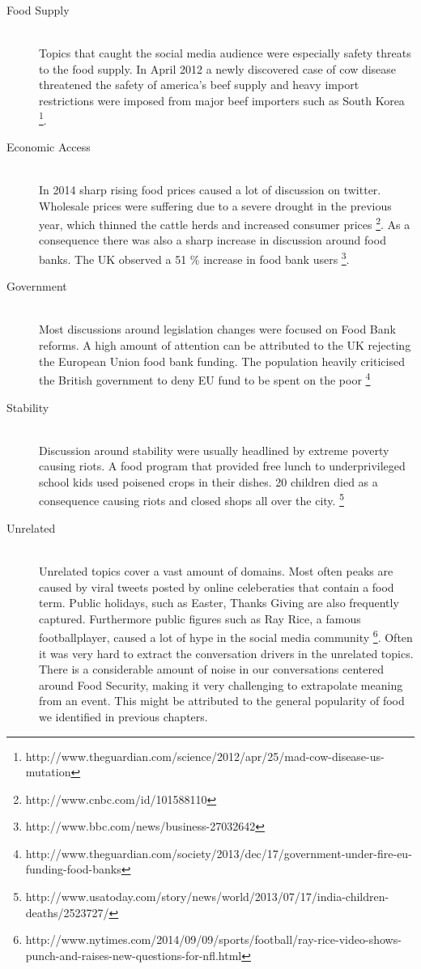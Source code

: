 \begin{description}
  \item[Food Supply ] \hfill \\
 Topics that caught the social media audience were especially safety threats to the food supply. In April 2012 a newly discovered case of cow disease threatened the safety of america's beef supply and heavy import restrictions were imposed from major beef importers such as South Korea \footnote{http://www.theguardian.com/science/2012/apr/25/mad-cow-disease-us-mutation}.
  \item[Economic Access] \hfill \\
  In 2014 sharp rising food prices caused a lot of discussion on twitter. Wholesale prices were suffering due to a severe drought in the previous year, which thinned the cattle herds and increased consumer prices \footnote{http://www.cnbc.com/id/101588110}. As a consequence there was also a sharp increase in discussion around food banks. The UK observed a 51 \% increase in food bank users \footnote{http://www.bbc.com/news/business-27032642}. 
  \item[Government] \hfill \\
  Most discussions around legislation changes were focused on Food Bank reforms. A high amount of attention can be attributed to the UK rejecting the European Union food bank funding. The population heavily criticised the British government to deny EU fund to be spent on the poor \footnote{http://www.theguardian.com/society/2013/dec/17/government-under-fire-eu-funding-food-banks}
    \item[Stability] \hfill \\
  Discussion around stability were usually headlined by extreme poverty causing riots. A food program that provided free lunch to underprivileged school kids used poisened crops in their dishes. 20 children died as a consequence causing riots and closed shops all over the city. \footnote{http://www.usatoday.com/story/news/world/2013/07/17/india-children-deaths/2523727/}
   \item[Unrelated] \hfill \\
   Unrelated topics cover a vast amount of domains. Most often peaks are caused by viral tweets posted by online celeberaties that contain a food term. Public holidays, such as Easter, Thanks Giving are also frequently captured. Furthermore public figures such as Ray Rice, a famous footballplayer, caused a lot of hype in the social media community \footnote{http://www.nytimes.com/2014/09/09/sports/football/ray-rice-video-shows-punch-and-raises-new-questions-for-nfl.html}. Often it was very hard to extract the conversation drivers in the unrelated topics. There is a considerable amount of noise in our conversations centered around Food Security, making it very challenging to extrapolate meaning from an event. This might be attributed to the general popularity of food we identified in previous chapters. 

\end{description}




